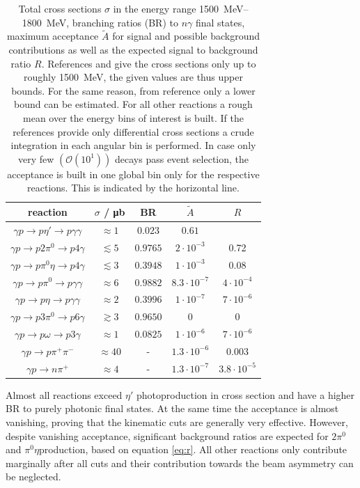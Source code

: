 \begin{table}[htbp]
	\centering
	\begin{tabular}{ccccc}
		\toprule
		reaction & $\sigma$ / \si{\micro\barn} & BR\cite{pdg} & $\tilde{A}$&$R$\\
		\hline
		$\gamma p\to p\eta'\to p\gamma\gamma$ &$\approx1$ \cite{etap_cs}& $0.023$ & $0.61$&\\
		$\gamma p\to p2\pi^0\to p4\gamma$ &$\lesssim5$ \cite{2pi0_cs}&$0.9765$& $2\cdot10^{-3}$&0.72\\
		$\gamma p\to p\pi^0\eta\to p 4\gamma$ &$\lesssim3$ \cite{pi0eta_cs} &$0.3948$&$1\cdot 10^{-3}$&0.08\\
		\hline
		$\gamma p \to p\pi^0\to p\gamma\gamma$&$\approx 6$\cite{pi0_cs2}&$0.9882$&$8.3\cdot10^{-7}$&$4\cdot10^{-4}$\\
		$\gamma p \to p\eta\to p\gamma\gamma$&$\approx 2$ \cite{etap_cs}&$0.3996$&$1\cdot10^{-7}$&$7\cdot10^{-6}$\\
		$\gamma p \to p3\pi^0\to p6\gamma$&$\gtrsim 3$\cite{3pi0cs} &$0.9650$&0&0\\
		$\gamma p \to p\omega \to p3\gamma$&$\approx 1$ \cite{omegacs}&$0.0825$&$1\cdot10^{-6}$&$7\cdot10^{-6}$\\
		$\gamma p \to p\pi^+\pi^-$&$\approx40$ \cite{pipics}&-&$1.3\cdot 10^{-6}$&$0.003$\\
		$\gamma p \to n\pi^+$&$\approx 4$ \cite{npiplcs}&-&$1.3\cdot10^{-7}$&$3.8\cdot10^{-5}$\\
		\bottomrule 		
	\end{tabular}
\caption{Total cross sections $\sigma$ in the energy range \SIrange{1500}{1800}{\mega\eV}, branching ratios (BR) to $n\gamma$ final states, maximum acceptance $\tilde{A}$ for signal and possible background contributions as well as the expected signal to background ratio $R$. References \cite{2pi0_cs} and \cite{pi0eta_cs} give the cross sections only up to roughly \SI{1500}{\mega\eV}, the given values are thus upper bounds. For the same reason, from reference \cite{3pi0cs} only a lower bound can be estimated. For all other reactions a rough mean over the energy bins of interest is built. If the references provide only differential cross sections a crude integration in each angular bin is performed. In case only very few $\left(\mathcal{O}\left(10^1\right)\right)$ decays pass event selection, the acceptance is built in one global bin only for the respective reactions. This is indicated by the horizontal line.}
\label{tab:plausmc}
\end{table}
\noindent Almost all reactions exceed $\eta'$ photoproduction in cross section and have a higher BR to purely photonic final states. At the same time the acceptance is almost vanishing, proving that the kinematic cuts are generally very effective. However, despite vanishing acceptance, significant background ratios are expected for $2\pi^0$ and $\pi^0\eta$production, based on equation \eqref{eq:r}. All other reactions only contribute marginally after all cuts and their contribution towards the beam asymmetry can be neglected.  


